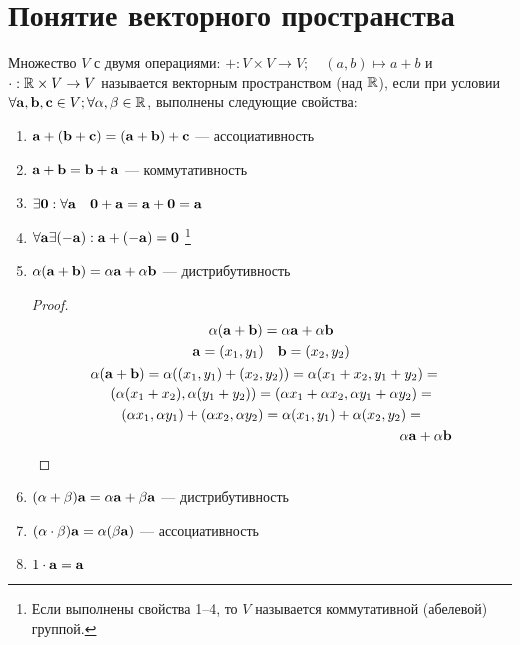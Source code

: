 \documentclass[main]{subfiles}
\begin{document}
\chapter{Понятие векторного пространства}
\begin{definition}
    Множество $V$ с двумя операциями:
    $+:V\times V \to V; \quad (a,b) \mapsto a+b$ и
    $\cdot : \mathbb{R} \times V \to V$ называется векторным пространством (над $\mathbb{R}$),
    если при условии $\forall \mathbf{a}, \mathbf{b}, \mathbf{c} \in V; \forall \alpha, \beta \in \mathbb{R}$, выполнены следующие свойства:

    \begin{enumerate}
        \item $\mathbf{a}+(\mathbf{b}+\mathbf{c}) = (\mathbf{a}+\mathbf{b})+\mathbf{c}$ --- ассоциативность
        \item $\mathbf{a}+\mathbf{b}=\mathbf{b}+\mathbf{a}$ --- коммутативность
        \item $\exists \mathbf{0}:\forall \mathbf{a} \quad \mathbf{0}+\mathbf{a}=\mathbf{a}+\mathbf{0}=\mathbf{a}$
        \item $\forall \mathbf{a} \exists (-\mathbf{a}): \mathbf{a}+(-\mathbf{a})=\mathbf{0}$%
              \footnote{Если выполнены свойства 1--4, то $V$ называется коммутативной (абелевой) группой.}
        \item $\alpha(\mathbf{a}+\mathbf{b})=\alpha \mathbf{a} + \alpha \mathbf{b}$ --- дистрибутивность \begin{proof}
                  \begin{gather*}
                      \alpha (\va+\vb) = \alpha \va + \alpha \vb \\
                      \va = (x_1, y_1) \quad \vb = (x_2, y_2)\\
                      \begin{multlined}
                          \alpha(\va+\vb)=\alpha((x_1, y_1)+(x_2, y_2)) = \alpha (x_1+x_2, y_1+y_2)=\\
                          (\alpha(x_1+x_2), \alpha(y_1+y_2))=(\alpha x_1 + \alpha x_2, \alpha y_1 + \alpha y_2)=\\
                          (\alpha x_1, \alpha y_1)+(\alpha x_2, \alpha y_2) = \alpha (x_1, y_1) + \alpha (x_2, y_2)= \\
                          \alpha \va + \alpha \vb
                      \end{multlined}
                  \end{gather*}
              \end{proof}
        \item $(\alpha+\beta)\mathbf{a} = \alpha \mathbf{a} + \beta \mathbf{a}$ --- дистрибутивность
        \item $(\alpha \cdot \beta)\mathbf{a} = \alpha(\beta \mathbf{a})$ --- ассоциативность
        \item $1\cdot \mathbf{a} = \mathbf{a}$
    \end{enumerate}
\end{definition}
\end{document}
